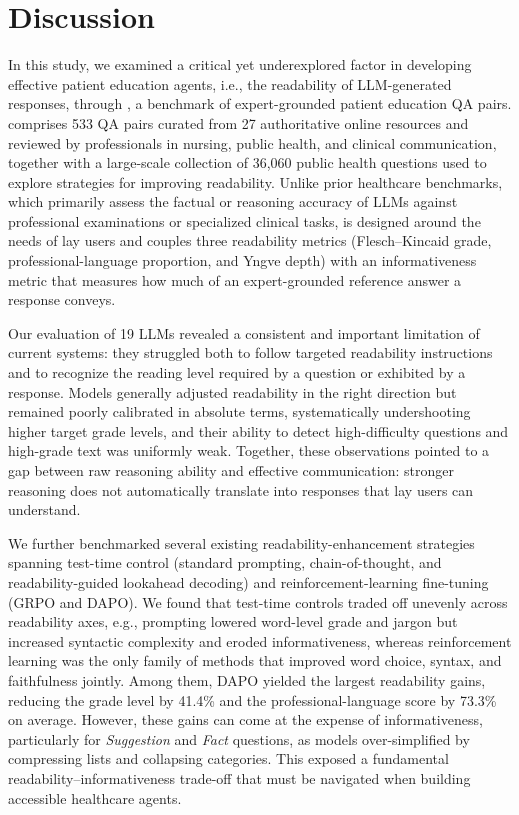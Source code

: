 \section{Discussion}\label{sec:discussion}

In this study, we examined a critical yet underexplored factor in developing effective patient education agents, i.e., the readability of LLM-generated responses, through \repqa, a benchmark of expert-grounded patient education QA pairs.
\repqa comprises 533 QA pairs curated from 27 authoritative online resources and reviewed by professionals in nursing, public health, and clinical communication, together with a large-scale collection of 36,060 public health questions used to explore strategies for improving readability.
Unlike prior healthcare benchmarks, which primarily assess the factual or reasoning accuracy of LLMs against professional examinations or specialized clinical tasks, \repqa is designed around the needs of lay users and couples three readability metrics (Flesch--Kincaid grade, professional-language proportion, and Yngve depth) with an informativeness metric that measures how much of an expert-grounded reference answer a response conveys.

Our evaluation of 19 LLMs revealed a consistent and important limitation of current systems: they struggled both to follow targeted readability instructions and to recognize the reading level required by a question or exhibited by a response.
Models generally adjusted readability in the right direction but remained poorly calibrated in absolute terms, systematically undershooting higher target grade levels, and their ability to detect high-difficulty questions and high-grade text was uniformly weak.
Together, these observations pointed to a gap between raw reasoning ability and effective communication: stronger reasoning does not automatically translate into responses that lay users can understand.

We further benchmarked several existing readability-enhancement strategies spanning test-time control (standard prompting, chain-of-thought, and readability-guided lookahead decoding) and reinforcement-learning fine-tuning (GRPO and DAPO).
We found that test-time controls traded off unevenly across readability axes, e.g., prompting lowered word-level grade and jargon but increased syntactic complexity and eroded informativeness, whereas reinforcement learning was the only family of methods that improved word choice, syntax, and faithfulness jointly.
Among them, DAPO yielded the largest readability gains, reducing the grade level by 41.4\% and the professional-language score by 73.3\% on average.
However, these gains can come at the expense of informativeness, particularly for \textit{Suggestion} and \textit{Fact} questions, as models over-simplified by compressing lists and collapsing categories. This exposed a fundamental readability–informativeness trade-off that must be navigated when building accessible healthcare agents.

